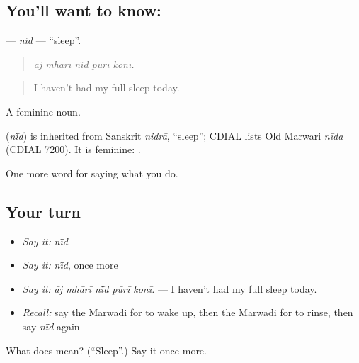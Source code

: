 \subsection*{You'll want to know: }
\textbf{} — \emph{nī̃d} — \textquotedblleft{}sleep\textquotedblright{}.

\begin{quote}
    
\end{quote}

\begin{quote}
\emph{āj mhārī nī̃d pūrī konī.}
\end{quote}

\begin{quote}
I haven't had my full sleep today.
\end{quote}

A feminine noun.

\begin{cousinweb}
\textbf{} (\emph{nī̃d}) is inherited from Sanskrit \emph{nidrā}, \textquotedblleft{}sleep\textquotedblright{}; CDIAL lists Old Marwari \emph{nīda} (CDIAL 7200). It is feminine: \textbf{ }.
\end{cousinweb}

\begin{grammarlens}[title={What you've built}]
One more word for saying what you do.
\end{grammarlens}

\subsection*{Your turn}
\begin{itemize}
\raggedright
  \item \emph{Say it:} \emph{nī̃d}
  \item \emph{Say it:} \emph{nī̃d}, once more
  \item \emph{Say it:} \emph{āj mhārī nī̃d pūrī konī.} — I haven't had my full sleep today.
  \item \emph{Recall:} say the Marwadi for to wake up, then the Marwadi for to rinse, then say \emph{nī̃d} again
\end{itemize}

\begin{tcolorbox}[breakable,colback=teal!4,colframe=teal!35!black,title={Before you move on}]
What does  mean? (\textquotedblleft{}Sleep\textquotedblright{}.) Say it once more.
\end{tcolorbox}
